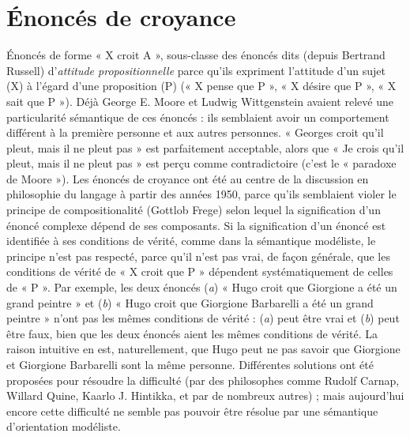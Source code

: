 
\chapter{Énoncés de croyance}

Énoncés de forme
« X croit A », sous-classe des énoncés dits
(depuis Bertrand Russell) d’{\it attitude
propositionnelle}
parce qu’ils expriment l’attitude
d’un sujet (X) à l'égard d’une
proposition (P) (« X pense que P », « X
désire que P », « X sait que P »). Déjà
George E. Moore et Ludwig Wittgenstein
avaient relevé une particularité sémantique
de ces énoncés : ils semblaient avoir
un comportement différent à la première
personne et aux autres personnes.
« Georges croit qu’il pleut, mais il ne
pleut pas » est parfaitement acceptable,
alors que « Je crois qu’il pleut, mais il ne
pleut pas » est perçu comme contradictoire
(c’est le « paradoxe de Moore »).
Les énoncés de croyance ont été au centre
de la discussion en philosophie du langage
à partir des années 1950, parce qu’ils semblaient
violer le principe de compositionalité
(Gottlob Frege) selon lequel la
signification d’un énoncé complexe
dépend de ses composants. Si la signification
d’un énoncé est identifiée à ses
conditions de vérité, comme dans la
sémantique modéliste, le principe n’est
pas respecté, parce qu’il n’est pas vrai, de
façon générale, que les conditions de
vérité de « X croit que P » dépendent systématiquement
de celles de « P ». Par
exemple, les deux énoncés ({\it a}) « Hugo
croit que Giorgione a été un grand peintre »
et ({\it b}) « Hugo croit que Giorgione
Barbarelli a été un grand peintre » n’ont
pas les mêmes conditions de vérité : ({\it a})
peut être vrai et ({\it b}) peut être faux, bien
que les deux énoncés aient les mêmes
conditions de vérité. La raison intuitive en
est, naturellement, que Hugo peut ne pas
savoir que Giorgione et Giorgione Barbarelli
sont la même personne. Différentes
solutions ont été proposées pour résoudre
la difficulté (par des philosophes comme
Rudolf Carnap, Willard Quine, Kaarlo
J. Hintikka, et par de nombreux autres) ;
mais aujourd’hui encore cette difficulté ne
semble pas pouvoir être résolue par une
sémantique d’orientation modéliste.

